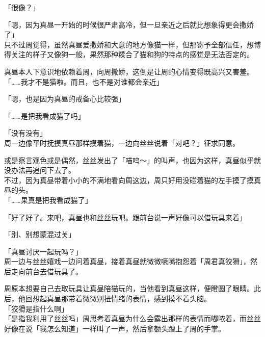 「很像？」

「嗯，因为真昼一开始的时候很严肃高冷，但一旦亲近之后就比想象得更会撒娇了」\\

只不过周觉得，虽然真昼爱撒娇和大意的地方像猫一样，但那寄予全部信任，想博得关注的样子又像狗一般，果然那种糅合了猫和狗的特点的感觉是无法否定的。

真昼本人下意识地依赖着周，向周撒娇，这倒是让周的心情变得既高兴又害羞。\\

「……我才不是猫啦。而且，也不是对谁都会亲近」

「嗯，也是因为真昼的戒备心比较强」

「……是把我看成猫了吗」

「没有没有」\\

周一边像平时抚摸真昼那样摸着猫，一边向丝丝说着「对吧？」征求同意。

或是察言观色或是偶然，丝丝发出了「喵呜～」的叫声，也因为这样，真昼似乎就没办法再追问下去了。\\

不过，因为真昼带着小小的不满地看向周这边，周只好用没碰着猫的左手摸了摸真昼的头。\\

「……果真是把我看成猫了」

「好了好了。来吧，真昼也和丝丝玩吧。跟前台说一声好像可以借玩具来着」

「别、别想蒙混过关」

「真昼讨厌一起玩吗？」\\

周一边与丝丝嬉戏一边问着真昼，接着真昼就微微噘嘴抱怨着「周君真狡猾」，然后走向前台去借玩具了。

周原本想要自己去取玩具让真昼陪猫玩的，当他看到真昼这样，便瞪圆了眼睛。此后，他回想起真昼那带着微微别扭情绪的表情，感到摸不着头脑。\\

「狡猾是指什么啊」\\

「是指我利用了丝丝吗」周思考着真昼为什么会露出那样的表情而嘟哝着，而丝丝好像在说「我怎么知道」一样叫了一声，然后拿额头蹭上了周的手掌。
